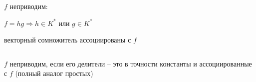     \par \quad $f$ неприводим:
    \par \quad \quad $f = hg \Rightarrow h \in K^*$ или $g \in K^*$
    \par \quad \quad векторный сомножитель ассоциированы с $f$
    \par $ $
    \par \quad $f$ неприводим, если его делители -- это в точности константы и ассоциированные с $f$ (полный аналог простых)

    \begin{theorem}[ОТА]
        
    \end{theorem}


